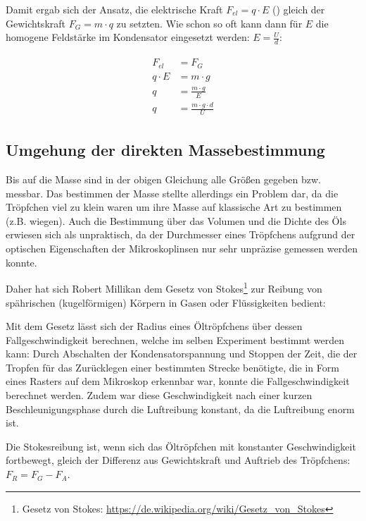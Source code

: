 Damit ergab sich der Ansatz, die elektrische Kraft $F_{el}=q \cdot E$ () gleich der Gewichtskraft $F_G = m \cdot q$ zu setzten. Wie schon so oft kann dann für $E$ die homogene Feldstärke im Kondensator eingesetzt werden: $E = \frac{U}{d}$:

\begin{align} \label{eq:MillikanAnsatz}
\begin{split}
	F_{el} &= F_G \\
	q \cdot E &= m \cdot g \\
	q &= \frac{m \cdot g}{E} \\
	q &= \frac{m \cdot g \cdot d}{U}
\end{split}
\end{align}


\subsection{Umgehung der direkten Massebestimmung}

Bis auf die Masse sind in der obigen Gleichung alle Größen gegeben bzw. messbar. Das bestimmen der Masse stellte allerdings ein Problem dar, da die Tröpfchen viel zu klein waren um ihre Masse auf klassische Art zu bestimmen (z.B. wiegen). Auch die Bestimmung über das Volumen und die Dichte des Öls erwiesen sich als unpraktisch, da der Durchmesser eines Tröpfchens aufgrund der optischen Eigenschaften der Mikroskoplinsen nur sehr unpräzise gemessen werden konnte.

Daher hat sich Robert Millikan dem Gesetz von Stokes\footnote{Gesetz von Stokes: \url{https://de.wikipedia.org/wiki/Gesetz_von_Stokes}} zur Reibung von spährischen (\glqq kugelförmigen\grqq) Körpern in Gasen oder Flüssigkeiten bedient: 

Mit dem Gesetz lässt sich der Radius eines Öltröpfchens über dessen Fallgeschwindigkeit berechnen, welche im selben Experiment bestimmt werden kann: Durch Abschalten der Kondensatorspannung und Stoppen der Zeit, die der Tropfen für das Zurücklegen einer bestimmten Strecke benötigte, die in Form eines Rasters auf dem Mikroskop erkennbar war, konnte die Fallgeschwindigkeit berechnet werden. Zudem war diese Geschwindigkeit nach einer kurzen Beschleunigungsphase durch die Luftreibung konstant, da die Luftreibung enorm ist.

Die Stokesreibung ist, wenn sich das Öltröpfchen mit konstanter Geschwindigkeit fortbewegt, gleich der Differenz aus Gewichtskraft und Auftrieb des Tröpfchens: $F_R = F_G - F_A$.

